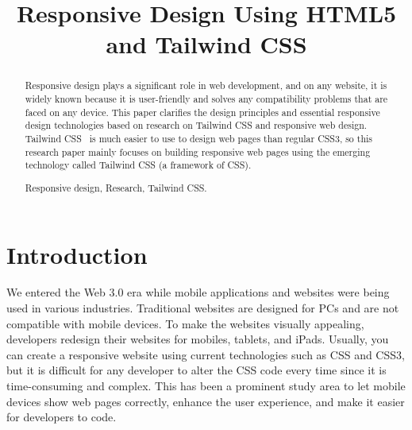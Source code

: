 \documentclass[conference]{IEEEtran}
\begin{document}
\title{Responsive Design Using HTML5 and Tailwind CSS\\
}

\author{
\and

\and

}



\maketitle

\begin{abstract}
Responsive design plays a significant role in web development, and on any website, it is widely known because it is user-friendly and solves any compatibility problems that are faced on any device. This paper clarifies the design principles and essential responsive design technologies based on research on Tailwind CSS and responsive web design. Tailwind CSS  is much easier to use to design web pages than regular CSS3, so this research paper mainly focuses on building responsive web pages using the emerging technology called Tailwind CSS (a framework of CSS).
\newline


\begin{IEEEkeywords}
Responsive design, Research, Tailwind CSS.
\end{IEEEkeywords}

\end{abstract}

\section{Introduction}
We entered the Web 3.0 era while mobile applications and websites were being used in various industries. Traditional websites are designed for PCs and are not compatible with mobile devices. To make the websites visually appealing, developers redesign their websites for mobiles, tablets, and iPads. Usually, you can create a responsive website using current technologies such as CSS and CSS3, but it is difficult for any developer to alter the CSS code every time since it is time-consuming and complex. This has been a prominent study area to let mobile devices show web pages correctly, enhance the user experience, and make it easier for developers to code.
\end{document}
